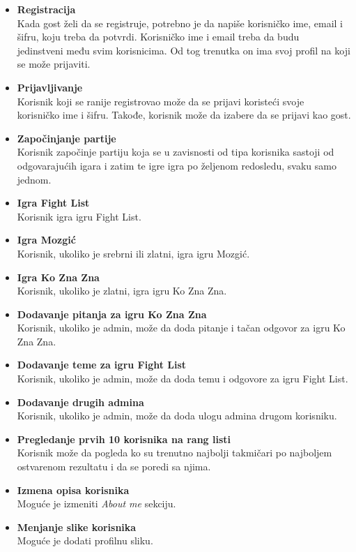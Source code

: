 \documentclass{article}
\begin{document}
\begin{itemize}
    \item \textbf{Registracija} \\
    Kada gost želi da se registruje, potrebno je da napiše korisničko ime, email i šifru, koju treba da potvrdi. Korisničko ime i email treba da budu \\ jedinstveni među svim korisnicima. Od tog trenutka on ima svoj profil na koji se može prijaviti.
    \item \textbf{Prijavljivanje} \\
    Korisnik koji se ranije registrovao može da se prijavi koristeći svoje \\ korisničko ime i šifru. Takođe, korisnik može da izabere da se prijavi kao gost.
    
    \item \textbf{Započinjanje partije} \\
    Korisnik započinje partiju koja se u zavisnosti od tipa korisnika sastoji od odgovarajućih igara i zatim te igre igra po željenom redosledu, svaku samo jednom.

    \item \textbf{Igra Fight List} \\
    Korisnik igra igru Fight List.
    \item \textbf{Igra Mozgić} \\
    Korisnik, ukoliko je srebrni ili zlatni, igra igru Mozgić.
    \item \textbf{Igra Ko Zna Zna} \\
    Korisnik, ukoliko je zlatni, igra igru Ko Zna Zna.
    
    \item \textbf{Dodavanje pitanja za igru Ko Zna Zna} \\
    Korisnik, ukoliko je admin, može da doda pitanje i tačan odgovor za igru Ko Zna Zna.
    \item \textbf{Dodavanje teme za igru Fight List} \\
    Korisnik, ukoliko je admin, može da doda temu i odgovore za igru Fight List.
    \item \textbf{Dodavanje drugih admina} \\
    Korisnik, ukoliko je admin, može da doda ulogu admina drugom korisniku.

    \item \textbf{Pregledanje prvih 10 korisnika na rang listi} \\
    Korisnik može da pogleda ko su trenutno najbolji takmičari po najboljem ostvarenom rezultatu i da se poredi sa njima.
    \item \textbf{Izmena opisa korisnika} \\
    Moguće je izmeniti \textit{About me} sekciju.
    \item \textbf{Menjanje slike korisnika} \\
    Moguće je dodati profilnu sliku.
\end{itemize}
\end{document}

